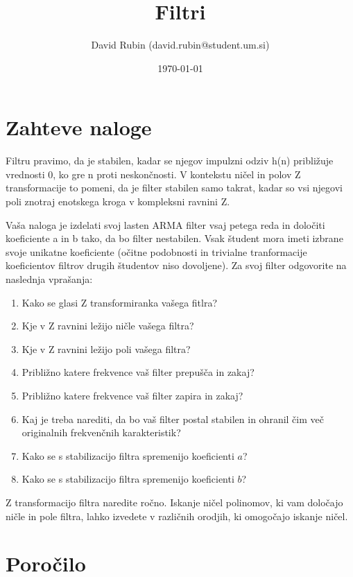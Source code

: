 \documentclass[a4paper,11pt]{article}
\title{Filtri}
\author{David Rubin (david.rubin@student.um.si)}
\date{\today}
\begin{document}
\maketitle

\section{Zahteve naloge}

Filtru pravimo, da je stabilen, kadar se njegov impulzni odziv h(n) približuje vrednosti 0, ko gre n proti neskončnosti. V kontekstu ničel in polov Z transformacije to pomeni, da je filter stabilen samo takrat, kadar so vsi njegovi poli znotraj enotskega kroga v kompleksni ravnini Z.

Vaša naloga je izdelati svoj lasten ARMA filter vsaj petega reda in določiti koeficiente a in b tako, da bo filter nestabilen. Vsak študent mora imeti izbrane svoje unikatne koeficiente (očitne podobnosti in trivialne tranformacije koeficientov filtrov drugih študentov niso dovoljene). Za svoj filter odgovorite na naslednja vprašanja:  
\begin{enumerate}
 
\item Kako se glasi Z transformiranka vašega fitlra?
\item Kje v Z ravnini ležijo ničle vašega filtra?
\item Kje v Z ravnini ležijo poli vašega filtra?
\item Približno katere frekvence vaš filter prepušča in zakaj?
\item Približno katere frekvence vaš filter zapira in zakaj?
\item Kaj je treba narediti, da bo vaš filter postal stabilen in ohranil čim več originalnih frekvenčnih karakteristik?
\item Kako se s stabilizacijo filtra spremenijo koeficienti $a$?
\item Kako se s stabilizacijo filtra spremenijo koeficienti $b$?

\end{enumerate}
Z transformacijo filtra naredite ročno. Iskanje ničel polinomov, ki vam določajo ničle in pole filtra, lahko izvedete v različnih orodjih, ki omogočajo iskanje ničel.

\section{Poročilo}
\end{document}
